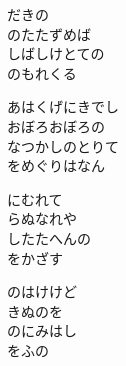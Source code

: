 \documentclass[10pt,b5j]{tarticle} %
\begin{document}
\vspace{1.5em} %
\newcommand{\linespace}{0.5em} %
\newcommand{\blocksize}{0.5\hsize} %
\begin{enumerate} %
    \begin{minipage}[c]{\blocksize}
    
        \vspace{\linespace}
        \item
        だきの\\
        のたたずめば\\
        しばしけとての\\
        のもれくる
        
        \vspace{\linespace}
        \item
        あはくげにきでし\\
        おぼろおぼろの\\
        なつかしのとりて\\
        をめぐりはなん
        
        \vspace{\linespace}
        \item
        にむれて\\
        らぬなれや\\
        したたへんの\\
        をかざす
        
        \vspace{\linespace}
        \item
        のはけけど\\
        きぬのを\\
        のにみはし\\
        をふの
    
    \end{minipage}
\end{enumerate} %
\end{document}
